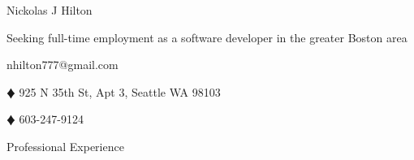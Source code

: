 \documentclass{article}
\newcommand{\lineseparator}[1]{\noindent\makebox[\linewidth]{\rule{\textwidth}{#1}}}
\begin{document}
\begin{minipage}[t]{0.4\textwidth}
  \hspace{-6.5mm}
  {\Huge Nickolas J Hilton }
\end{minipage}
\hspace{-6.5mm}
\begin{minipage}[b]{0.6\textwidth}
  \begin{flushright}
    {\small Seeking full-time employment as a software developer in the greater Boston area }
  \end{flushright}
\end{minipage}
\vspace{1mm}
\lineseparator{1.5pt}
\vspace{-2mm}
\begin{center}
  nhilton777@gmail.com 
  \begin{inparaitem}
  \item[$\vardiamond$] 925 N 35th St, Apt 3, Seattle WA 98103
  \item[$\vardiamond$] 603-247-9124 
  \end{inparaitem}
\end{center}
{\Large Professional Experience } \\
\lineseparator{0.5pt}
\\[4mm]
\end{document}
